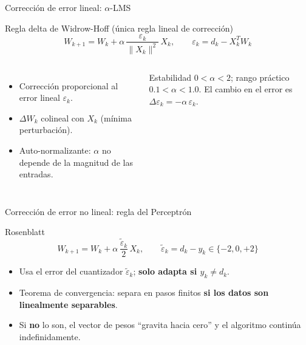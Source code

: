 \documentclass[aspectratio=169, 11pt, xcolor={dvipsnames,table}]{beamer}
\newcommand{\azul}[1]{\textcolor{UsachAzul}{#1}}
\newcommand{\naranja}[1]{\textcolor{UsachNaranja}{#1}}
\begin{document}
\begin{frame}{Corrección de error lineal: $\alpha$-LMS}
\begin{block}{Regla delta de Widrow-Hoff (única regla lineal de corrección)}
\[
W_{k+1} = W_k + \alpha\,\frac{\varepsilon_k}{\lVert X_k\rVert^{2}}\,X_k,
\qquad \varepsilon_k = d_k - X_k^{T} W_k
\]
\end{block}
\begin{columns}[T]
\begin{itemize}
  \item Corrección proporcional al \azul{error lineal} $\varepsilon_k$.
  \item $\Delta W_k$ colineal con $X_k$ (mínima perturbación).
  \item \naranja{Auto-normalizante}: $\alpha$ no depende de la magnitud de las entradas.
\end{itemize}
\begin{tipbox}
Estabilidad $0<\alpha<2$; rango práctico $0.1<\alpha<1.0$. El cambio en el error es
$\Delta\varepsilon_k = -\alpha\,\varepsilon_k$.
\end{tipbox}
\end{columns}
\end{frame}

\begin{frame}{Corrección de error no lineal: regla del Perceptrón}
\begin{block}{Rosenblatt}
\[
W_{k+1} = W_k + \alpha\,\frac{\tilde{\varepsilon}_k}{2}\,X_k,
\qquad \tilde{\varepsilon}_k = d_k - y_k \in \{-2,0,+2\}
\]
\end{block}
\begin{itemize}
  \item Usa el \azul{error del cuantizador} $\tilde{\varepsilon}_k$; \textbf{solo adapta si $y_k\neq d_k$}.
  \item \naranja{Teorema de convergencia}: separa en pasos finitos \textbf{si los datos son linealmente separables}.
  \item Si \textbf{no} lo son, el vector de pesos ``gravita hacia cero'' y el algoritmo continúa indefinidamente.
\end{itemize}
\end{frame}
\end{document}

